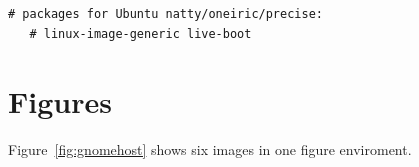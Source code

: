 \documentclass[11pt
  , a4paper
  , article
  , oneside
]{memoir}
\begin{document}
{\begin{lstlisting}[style=termstylenumber, caption={Editing \texttt{/etc/fai/NFSROOT}}, label={list:nfsroot-file}]
    # packages for Ubuntu natty/oneiric/precise:
   # linux-image-generic live-boot
\end{lstlisting}



\section{Figures}
Figure~\ref{fig:gnomehost} shows six images in one figure enviroment.

\begin{figure}[!htb]
  \centering
 
            \hfill
            \hfill

\end{figure}}
\end{document}

